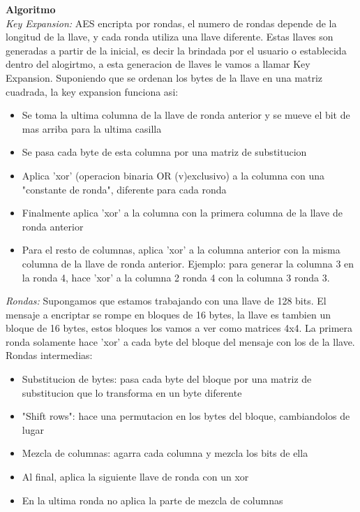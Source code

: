 \documentclass[spanish]{article}
\begin{document}
\textbf{Algoritmo}\\

\emph{Key Expansion:}
AES encripta por rondas, el numero de rondas depende de la longitud de la llave, y cada ronda utiliza una llave diferente. Estas llaves son generadas a partir de la inicial, es decir la brindada por el usuario o establecida dentro del alogirtmo, a esta generacion de llaves le vamos a llamar Key Expansion.
Suponiendo que se ordenan los bytes de la llave en una matriz cuadrada, la key expansion funciona asi:
\begin{itemize}
\item Se toma la ultima columna de la llave de ronda anterior y se mueve el bit de mas arriba para la ultima casilla
\item Se pasa cada byte de esta columna por una matriz de substitucion
\item Aplica 'xor' (operacion binaria OR (v)exclusivo) a la columna con una "constante de ronda", diferente para cada ronda
\item Finalmente aplica 'xor' a la columna con la primera columna de la llave de ronda anterior
\item Para el resto de columnas, aplica 'xor' a la columna anterior con la misma columna de la llave de ronda anterior. Ejemplo: para generar la columna 3 en la ronda 4, hace 'xor' a la columna 2 ronda 4 con la columna 3 ronda 3.
\end{itemize}

\emph{Rondas:}
Supongamos que estamos trabajando con una llave de 128 bits. El mensaje a encriptar se rompe en bloques de 16 bytes, la llave es tambien un bloque de 16 bytes, estos bloques los vamos a ver como matrices 4x4.
La primera ronda solamente hace 'xor' a cada byte del bloque del mensaje con los de la llave.
Rondas intermedias:
\begin{itemize}
\item Substitucion de bytes: pasa cada byte del bloque por una matriz de substitucion que lo transforma en un byte diferente
\item "Shift rows": hace una permutacion en los bytes del bloque, cambiandolos de lugar
\item Mezcla de columnas: agarra cada columna y mezcla los bits de ella
\item Al final, aplica la siguiente llave de ronda con un xor
\item En la ultima ronda no aplica la parte de mezcla de columnas
\end{itemize}
\end{document}

